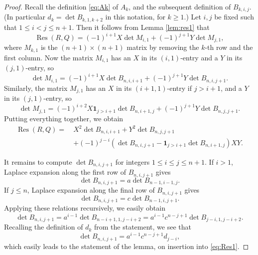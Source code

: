\documentclass[10pt,a4paper]{amsart}
\DeclareMathOperator{\Res}{Res}
\renewcommand{\geq}{\geqslant}
\renewcommand{\leq}{\leqslant}
\begin{document}
\begin{proof}
Recall the definition \eqref{eq:Ak} of $A_k$, 
and the subsequent definition of $B_{k,i,j}$.
(In particular $d_k=\det B_{k,1,k+2}$ in this notation, for $k\geq 1$.)
 Let $i,j$ be fixed such that  $1\leq i<j\leq n+1$. Then 
it follows from Lemma \ref{lem:res1} that 
\[
\Res(R,Q)=(-1)^{i+1}X\det M_{i,1}+(-1)^{j+1}Y\det M_{j,1},
\]
where $M_{k,1}$ is the $(n+1)\times(n+1)$ matrix by removing the $k$-th row and the first column.
Now the matrix $M_{i,1}$ has an $X$ in its $(i,1)$-entry and a $Y$ in its $(j,1)$-entry, so
\[\det M_{i,1}=(-1)^{i+1}X\det B_{n,i,i+1}+(-1)^{j+1}Y\det B_{n,i,j+1}.\]
Similarly, 
the matrix $M_{j,1}$ has an $X$ in its $(i+1,1)$-entry if $j>i+1$, and a $Y$ in its $(j,1)$-entry, so
\[\det M_{j,1}=(-1)^{i+2}X\mathbf{1}_{j> i+1}\det B_{n,i+1,j}+(-1)^{j+1} Y\det B_{n,j,j+1}.\]
Putting everything together, we obtain
\begin{equation}\label{eq:Res1}
\begin{split}
\Res(R,Q)
=~&
X^2\det B_{n,i,i+1}
+Y^2 \det B_{n,j,j+1}\\
&+(-1)^{j-i}\left(\det B_{n,i,j+1}-\mathbf{1}_{j> i+1}\det B_{n,i+1,j}\right)XY.
\end{split}
\end{equation}


It remains to compute $\det B_{n,i,j+1}$ for 
 integers $1\leq i\leq j\leq n+1$. 
If $i>1$,  Laplace expansion along the first row of $B_{n,i,j+1}$ gives
\[ \det B_{n,i,j+1}=a\det B_{n-1,i-1,j}.\]
If $j\leq n$, Laplace expansion along the final row of $B_{n,i,j+1}$ gives
\[ \det B_{n,i,j+1}=c\det B_{n-1,i,j+1}.\]
Applying these relations recursively, we easily obtain
\[ \det B_{n,i,j+1}
=a^{i-1}\det B_{n-i+1,1,j-i+2}
=a^{i-1}c^{n-j+1}
\det B_{j-i,1,j-i+2}.
\]
Recalling the definition of $d_k$ from the statement, 
we see that 
\[\det B_{n,i,j+1}=a^{i-1}c^{n-j+1}d_{j-i},
\]
which  easily leads to the statement of the lemma, on insertion into  \eqref{eq:Res1}.
\end{proof}
\end{document}
